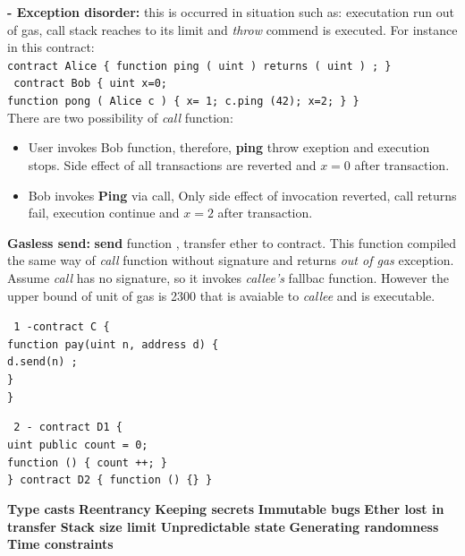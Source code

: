 \textbf{- Exception disorder: } this is occurred in situation such as: executation run out of gas, call stack reaches to its limit and \textit{throw} commend is executed.
For instance in this contract:\\
\texttt{\color{red}contract \color{black}Alice \{ \color{red}function \color{black}ping (\color{red} uint \color{black}) \color{red}returns \color{black}( \color{red}uint \color{black}) ; \}}\\
 \texttt{ \color{red}contract \color{black}Bob
 	\{\color{red} uint \color{black} x=0;
 	\\ \color{red}function \color{black}pong ( Alice c ) \{ x= 1; c.ping (42); x=2; \} \}}\\
 
 There are two possibility of \textit{call }function: 
 \begin{itemize}[label={},leftmargin=12.5mm]
  \item User invokes Bob function, therefore, \textbf{ping} throw exeption and execution stops. Side effect of all transactions are reverted and \(x=0\) after transaction.
  \item  Bob invokes \textbf{Ping } via call, Only side effect of invocation reverted, call returns fail, execution continue and \(x=2\)  after transaction.
 \end{itemize}
\textbf{Gasless send: }\textbf{send} function , transfer ether to contract. This function compiled the same way of \textit{call }function without signature and returns \textit{out of gas} exception.\\
Assume \textit{call} has no signature, so it invokes \textit{callee's } fallbac  function. However  the upper bound of unit of gas is 2300 that is avaiable to \textit{callee } and is executable.

\begin{multicols}{2}
	\texttt{
		\color{black} 1 -\color{red}contract \color{black}C \{\\
		\color{red}function \color{black}pay(\color{red}uint \color{black}n, \color{red}address \color{black}d) \{\\
		d.send(n) ;\\
		    \hspace*{4mm}\}\\
		\}}
	
	 
	\columnbreak
	
	
	\texttt{\color{black} 2 - \color{red}contract \color{black}D1 \{\\
			\color{red}uint public \color{black}count = 0;\\
			\color{red}function \color{black}() \{ count ++; \}\\
	       \}
		\color{red}contract \color{black}D2 \{ \color{red}function \color{black}() \{\} \}}
	 
\end{multicols}

\textbf{Type casts}
\textbf{Reentrancy}
\textbf{Keeping secrets}
\textbf{Immutable bugs}
\textbf{Ether lost in transfer}
\textbf{Stack size limit}
\textbf{Unpredictable state}
\textbf{Generating randomness}
\textbf{Time constraints}

